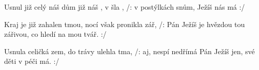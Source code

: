 \begin{TEXT}{Usnul již celý náš dům} %
\SLOKA {} již  náš ,
 v  šla ,
/:  v postýlkách  snům,
 Ježíš nás má  :/

\SLOKA Kraj je již zahalen tmou,
nocí však pronikla zář,
/: Pán Ježíš je hvězdou tou zářivou,
co hledí na mou tvář. :/

\SLOKA Usnula celičká zem,
do trávy ulehla tma,
/: aj, nespí nedřímá Pán Ježíš jen,
své děti v péči má. :/
\end{TEXT}